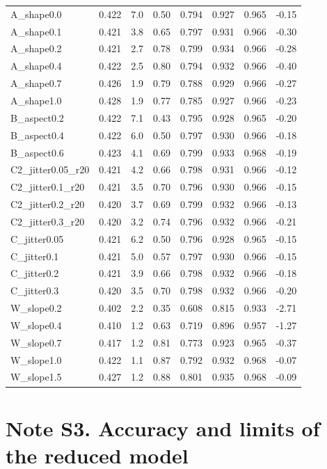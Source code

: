 \documentclass[10pt]{article}
\begin{document}
\begin{table}[htbp]
{\begin{tabular}{llllllll}
A_shape0.0 & 0.422 & 7.0 & 0.50 & 0.794 & 0.927 & 0.965 & -0.15 \\
A_shape0.1 & 0.421 & 3.8 & 0.65 & 0.797 & 0.931 & 0.966 & -0.30 \\
A_shape0.2 & 0.421 & 2.7 & 0.78 & 0.799 & 0.934 & 0.966 & -0.28 \\
A_shape0.4 & 0.422 & 2.5 & 0.80 & 0.794 & 0.932 & 0.966 & -0.40 \\
A_shape0.7 & 0.426 & 1.9 & 0.79 & 0.788 & 0.929 & 0.966 & -0.27 \\
A_shape1.0 & 0.428 & 1.9 & 0.77 & 0.785 & 0.927 & 0.966 & -0.23 \\
B_aspect0.2 & 0.422 & 7.1 & 0.43 & 0.795 & 0.928 & 0.965 & -0.20 \\
B_aspect0.4 & 0.422 & 6.0 & 0.50 & 0.797 & 0.930 & 0.966 & -0.18 \\
B_aspect0.6 & 0.423 & 4.1 & 0.69 & 0.799 & 0.933 & 0.968 & -0.19 \\
C2_jitter0.05_r20 & 0.421 & 4.2 & 0.66 & 0.798 & 0.931 & 0.966 & -0.12 \\
C2_jitter0.1_r20 & 0.421 & 3.5 & 0.70 & 0.796 & 0.930 & 0.966 & -0.15 \\
C2_jitter0.2_r20 & 0.420 & 3.7 & 0.69 & 0.799 & 0.932 & 0.966 & -0.13 \\
C2_jitter0.3_r20 & 0.420 & 3.2 & 0.74 & 0.796 & 0.932 & 0.966 & -0.21 \\
C_jitter0.05 & 0.421 & 6.2 & 0.50 & 0.796 & 0.928 & 0.965 & -0.15 \\
C_jitter0.1 & 0.421 & 5.0 & 0.57 & 0.797 & 0.930 & 0.966 & -0.15 \\
C_jitter0.2 & 0.421 & 3.9 & 0.66 & 0.798 & 0.932 & 0.966 & -0.18 \\
C_jitter0.3 & 0.420 & 3.5 & 0.70 & 0.798 & 0.932 & 0.966 & -0.20 \\
W_slope0.2 & 0.402 & 2.2 & 0.35 & 0.608 & 0.815 & 0.933 & -2.71 \\
W_slope0.4 & 0.410 & 1.2 & 0.63 & 0.719 & 0.896 & 0.957 & -1.27 \\
W_slope0.7 & 0.417 & 1.2 & 0.81 & 0.773 & 0.923 & 0.965 & -0.37 \\
W_slope1.0 & 0.422 & 1.1 & 0.87 & 0.792 & 0.932 & 0.968 & -0.07 \\
W_slope1.5 & 0.427 & 1.2 & 0.88 & 0.801 & 0.935 & 0.968 & -0.09 \\
\hline
\end{tabular}}
\end{table}

\section*{Note S3. Accuracy and limits of the reduced model}
\end{document}
